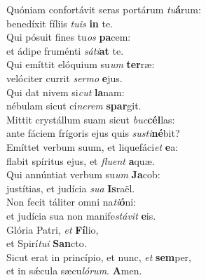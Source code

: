 \evenverse Quóniam confortávit seras portárum \textit{tu}\textbf{á}rum:~\*\\
\evenverse benedíxit fíliis \textit{tu}\textit{is} \textbf{in} te.\\
\oddverse Qui pósuit fines tu\textit{os} \textbf{pa}cem:~\*\\
\oddverse et ádipe fruménti \textit{sá}\textit{ti}\textbf{at} te.\\
\evenverse Qui emíttit elóquium su\textit{um} \textbf{ter}ræ:~\*\\
\evenverse velóciter currit \textit{ser}\textit{mo} \textbf{e}jus.\\
\oddverse Qui dat nivem si\textit{cut} \textbf{la}nam:~\*\\
\oddverse nébulam sicut cí\textit{ne}\textit{rem} \textbf{spar}git.\\
\evenverse Mittit crystállum suam sicut \textit{buc}\textbf{cél}las:~\*\\
\evenverse ante fáciem frígoris ejus quis \textit{su}\textit{sti}\textbf{né}bit?\\
\oddverse Emíttet verbum suum, et liquefáci\textit{et} \textbf{e}a:~\*\\
\oddverse flabit spíritus ejus, et \textit{flu}\textit{ent} \textbf{a}quæ.\\
\evenverse Qui annúntiat verbum su\textit{um} \textbf{Ja}cob:~\*\\
\evenverse justítias, et judícia \textit{su}\textit{a} \textbf{Is}raël.\\
\oddverse Non fecit táliter omni na\textit{ti}\textbf{ó}ni:~\*\\
\oddverse et judícia sua non manife\textit{stá}\textit{vit} \textbf{e}is.\\
\evenverse Glória Patri, \textit{et} \textbf{Fí}lio,~\*\\
\evenverse et Spirí\textit{tu}\textit{i} \textbf{San}cto.\\
\oddverse Sicut erat in princípio, et nunc, \textit{et} \textbf{sem}per,~\*\\
\oddverse et in sǽcula sæcu\textit{ló}\textit{rum}. \textbf{A}men.\\
